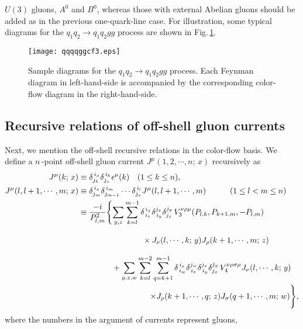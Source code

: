 \documentclass[a4paper,11pt]{article}
\begin{document}
$U(3)$ gluons,
$A^0$ and $B^0$, whereas those with external Abelian gluons should be
added as in the previous one-quark-line case. For illustration, some typical
diagrams for the $q_1q_2\rightarrow q_1q_2gg$ process
are shown in Fig.\,\ref{fig:2qqdiagrams}.
\begin{figure}
\begin{center}
\texttt{[image: qqqqggcf3.eps]}
\caption{Sample diagrams for the $q_1q_2\rightarrow q_1q_2gg$ process. Each
 Feynman diagram in left-hand-side is accompanied by the corresponding
 color-flow diagram in the right-hand-side.}
\label{fig:2qqdiagrams}
\end{center}
\end{figure}

\subsection{Recursive relations of off-shell gluon currents}
Next, we mention the off-shell recursive relations in the color-flow
basis. We define a $n$\,-point off-shell gluon current $J^{\mu}(1, 2,\cdots,n;\,x)$ recursively
as
\begin{align}
J^{\mu}(k;\,x)&\equiv\delta_{j_k}^{\,i_x}\delta_{j_x}^{\,i_k}\epsilon^{\mu}(k)\hspace{1em}(1\leq
 k\leq n),\label{j2}\\
J^{\mu}(l, l+1,\cdots,m;\,x)&\equiv\delta^{\,i_x}_{j_m}\delta^{\,i_m}_{j_{m-1}}\cdots\delta^{\,i_{l}}_{j_x}J^{\mu}(l, l+1,\cdots,m)\hspace{3em} (1\leq l < m\leq n)\nonumber\\
&\equiv\frac{-i}{P^2_{l, m}}\Biggl\{\sum_{y, z}\sum_{k=l}^{m-1}
\delta_{\,i_z}^{\,i_x}\delta_{\,i_y}^{j_z}\delta_{j_x}^{j_y}\,V^{\nu\rho\mu}_3(P_{l, k},P_{k+1, m},-P_{l, m})\nonumber\\
 &\hspace{8em}\times J_{\nu}
(l,\cdots,k;\,y)J_{\rho}(k+1,\cdots,m;\,z)\Biggr.\nonumber\\
&\hspace{4.2em}+\sum_{y, z, w}\sum_{k=l}^{m-2}\sum_{q=k+1}^{m-1}
\delta_{\,i_w}^{\,i_x}\delta_{\,i_z}^{j_w}\delta_{\,i_y}^{j_z}\delta_{j_x}^{j_y}
 \,V^{\nu\rho\sigma\mu}_4J_{\nu}(l, \cdots,k;\,y)\nonumber\\
 &\hspace{9em}\Biggl.\times J_{\rho}(k+1,\cdots,q;\,z)J_{\sigma}(q+1,\cdots,m;\,w)\Biggr\},
\label{eq:off-shell}
\end{align}
where the numbers in the argument of currents represent gluons,
\end{document}
